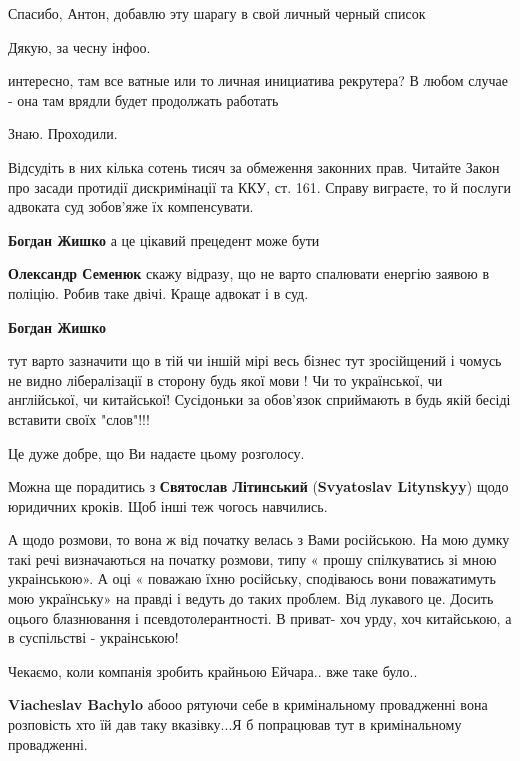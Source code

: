 \begin{itemize}
Спасибо, Антон, добавлю эту шарагу в свой личный черный список

Дякую, за чесну інфоо.

интересно, там все ватные или то личная инициатива рекрутера? В любом случае - она там врядли будет продолжать работать

Знаю. Проходили.


Відсудіть в них кілька сотень тисяч за обмеження законних прав. Читайте Закон
про засади протидії дискримінації та ККУ, ст. 161. Справу виграєте, то й
послуги адвоката суд зобов'яже їх компенсувати.

\begin{itemize} %
\textbf{Богдан Жишко} а це цікавий прецедент може бути

\textbf{Олександр Семенюк} скажу відразу, що не варто спалювати енергію заявою в поліцію. Робив таке двічі. Краще адвокат і в суд.

\textbf{Богдан Жишко} 

тут варто зазначити що в тій чи іншій мірі весь бізнес тут зросійщений і чомусь
не видно лібералізації в сторону будь якої мови ! Чи то української, чи
англійської, чи китайської! Сусідоньки за обов'язок сприймають в будь якій
бесіді вставити своїх "слов"!!!

\end{itemize} %


Це дуже добре, що Ви надаєте цьому розголосу.

Можна ще порадитись з \textbf{Святослав Літинський} (\textbf{Svyatoslav Litynskyy}) щодо
юридичних кроків. Щоб інші теж чогось навчились.

А щодо розмови, то вона ж від початку велась з Вами російською. На мою думку
такі речі визначаються на початку розмови, типу « прошу спілкуватись зі мною
украінською». А оці « поважаю їхню російську, сподіваюсь вони поважатимуть мою
українську» на правді і ведуть до таких проблем. Від лукавого це. Досить оцього
блазнювання і псевдотолерантності. В приват- хоч урду, хоч китайською, а в
суспільстві - украінською!


Чекаємо, коли компанія зробить крайньою Ейчара.. вже таке було..

\begin{itemize} %
\textbf{Viacheslav Bachylo} абооо рятуючи себе в кримінальному провадженні вона розповість хто їй дав таку вказівку...Я б попрацював тут в кримінальному провадженні.


\end{itemize}
\end{itemize}
